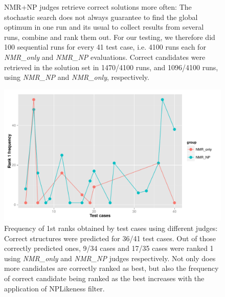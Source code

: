 \documentclass[10pt]{bmc_article}
\newenvironment{bmcformat}{\begin{raggedright}\baselineskip20pt\sloppy\setboolean{publ}{false}}{\end{raggedright}\baselineskip20pt\sloppy}
\begin{document}
\begin{bmcformat}
\begin{figure}[hbt]
  \caption{NMR+NP judges retrieve correct solutions more often:  The stochastic search does not always guarantee to find the global optimum in one run and its usual to collect results from several runs, combine and rank them out. For our testing, we therefore did 100 sequential runs for every 41 test case, i.e. 4100 runs each for  \emph {NMR\_only} and \emph {NMR\_NP} evaluations.  Correct candidates were retrieved in the solution set in 1470/4100 runs, and 1096/4100 runs, using \emph {NMR\_NP} and \emph {NMR\_only}, respectively.}
   
  \label{fig:retrieval}
\end{figure}

\begin{figure}[hbt]
\centering
	\includegraphics[angle=0,clip=false,scale=0.5]{pics/rank1s.pdf}
	\caption{Frequency of 1st ranks obtained by test cases using different judges: Correct structures were predicted for 36/41 test cases. Out of those correctly predicted ones, 9/34 cases and 17/35 cases were ranked 1 using \emph {NMR\_only} and \emph {NMR\_NP}  judges respectively. Not only does more candidates are correctly ranked as best, but also the frequency of correct candidate being ranked as the best increases with the application of NPLikeness filter.}
	\label{fig:rank1s}
\end{figure}


\end{bmcformat}
\end{document}
